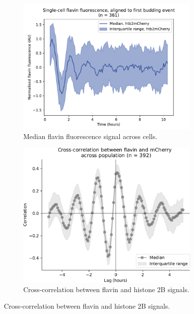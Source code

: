 \begin{figure}
\begin{subfigure}[htpb]{0.4\textwidth}
   \includegraphics[width=\textwidth]{htb2mCherry_26643_6}
   \caption{
    Median flavin fluorescence signal across cells.%
   }
   \label{fig:biology-highglc-sync-median}
  \end{subfigure}

  \begin{subfigure}[htpb]{0.4\textwidth}
   \centering
   \includegraphics[width=\textwidth]{xcf_edit.pdf}
   \caption{
    Cross-correlation between flavin and histone 2B signals.%
   }
   \label{fig:biology-highglc-sync-xcf}
  \end{subfigure}


\end{figure}
